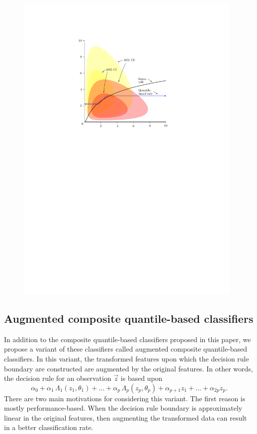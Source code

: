 \begin{figure}[ht]
\begin{minipage}[t]{0.49\linewidth}
    \includegraphics[width=0.975\textwidth]{gamma_cqc}
  \end{minipage}
\end{figure}


\subsection{Augmented composite quantile-based classifiers}
\label{sec:augmented}

In addition to the composite quantile-based classifiers proposed in this paper,
we propose a variant of these classifiers called augmented composite
quantile-based classifiers.  In this variant, the transformed features upon
which the decision rule boundary are constructed are augmented by the original
features.  In other words, the decision rule for an observation $\vec{z}$ is
based upon
\begin{equation}
  \label{eq:augmented-rule}
  \alpha_0 +
  \alpha_1 \,\Lambda_1 (z_1, \theta_1) +
  \dots +
  \alpha_p \,\Lambda_p (z_p, \theta_p) +
  \alpha_{p + 1} z_1 +
  \dots +
  \alpha_{2p} z_p.
\end{equation}
There are two main motivations for considering this variant.  The first reason
is mostly performance-based.  When the decision rule boundary is approximately
linear in the original features, then augmenting the transformed data can result
in a better classification rate.

